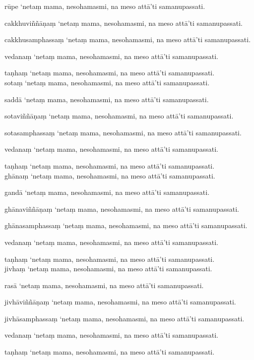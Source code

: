 \documentclass[10pt]{article}
\begin{document}
rūpe ‘netaṃ mama, nesohamasmi, na meso attā’ti samanupassati.\

cakkhuviññāṇaṃ ‘netaṃ mama, nesohamasmi, na meso attā’ti samanupassati.\

cakkhusamphassaṃ ‘netaṃ mama, nesohamasmi, na meso attā’ti samanupassati.\

vedanaṃ ‘netaṃ mama, nesohamasmi, na meso attā’ti samanupassati.\

taṇhaṃ ‘netaṃ mama, nesohamasmi, na meso attā’ti samanupassati.\\

sotaṃ ‘netaṃ mama, nesohamasmi, na meso attā’ti samanupassati.\

saddā ‘netaṃ mama, nesohamasmi, na meso attā’ti samanupassati.\

sotaviññāṇaṃ ‘netaṃ mama, nesohamasmi, na meso attā’ti samanupassati.\

sotasamphassaṃ ‘netaṃ mama, nesohamasmi, na meso attā’ti samanupassati.\

vedanaṃ ‘netaṃ mama, nesohamasmi, na meso attā’ti samanupassati.\

taṇhaṃ ‘netaṃ mama, nesohamasmi, na meso attā’ti samanupassati.\\

ghānaṃ ‘netaṃ mama, nesohamasmi, na meso attā’ti samanupassati.\

gandā ‘netaṃ mama, nesohamasmi, na meso attā’ti samanupassati.\

ghānaviññāṇaṃ ‘netaṃ mama, nesohamasmi, na meso attā’ti samanupassati.\

ghānasamphassaṃ ‘netaṃ mama, nesohamasmi, na meso attā’ti samanupassati.\

vedanaṃ ‘netaṃ mama, nesohamasmi, na meso attā’ti samanupassati.\

taṇhaṃ ‘netaṃ mama, nesohamasmi, na meso attā’ti samanupassati.\\

jivhaṃ ‘netaṃ mama, nesohamasmi, na meso attā’ti samanupassati.\

rasā ‘netaṃ mama, nesohamasmi, na meso attā’ti samanupassati.\

jivhāviññāṇaṃ ‘netaṃ mama, nesohamasmi, na meso attā’ti samanupassati.\

jivhāsamphassaṃ ‘netaṃ mama, nesohamasmi, na meso attā’ti samanupassati.\

vedanaṃ ‘netaṃ mama, nesohamasmi, na meso attā’ti samanupassati.\

taṇhaṃ ‘netaṃ mama, nesohamasmi, na meso attā’ti samanupassati.\\
\end{document}

